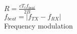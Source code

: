 \documentclass[preview]{standalone}
\begin{document}
$R = \frac{c T_{c} f_{beat}}{2 B}$\\$f_{beat} = \lvert f_{TX} - f_{RX} \rvert$\\Frequency modulation\\
\end{document}
